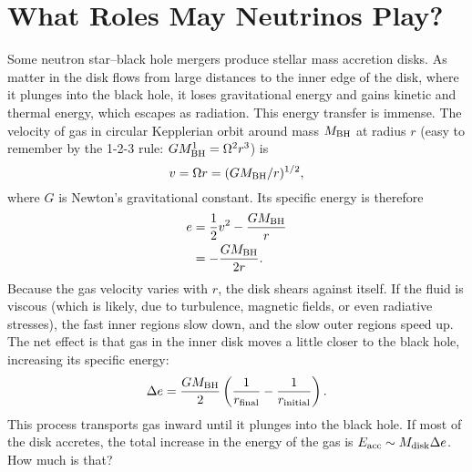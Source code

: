 \section{What Roles May Neutrinos Play?}
\label{sec:neutrino_roles}
Some neutron star--black hole mergers produce stellar mass accretion disks.
As matter in the disk flows from large distances to the
inner edge of the disk, where it plunges into the black hole, it loses
gravitational energy and gains kinetic and thermal energy, which escapes
as radiation. This energy transfer is immense. The velocity of gas in circular
Kepplerian orbit around mass $M_{\rm BH}$ at radius $r$
(easy to remember by the 1-2-3 rule: $GM_{\rm BH}^1=\Omega^2r^3$) is
\begin{equation}
  v = \Omega r  = (GM_{\rm BH}/r)^{1/2}, \nonumber
\end{equation}
where $G$ is Newton's gravitational constant.
Its specific energy is therefore
\begin{align}
  e &= \frac{1}{2}v^2-\frac{GM_{\rm BH}}{r} \nonumber \\
  &= -\frac{GM_{\rm BH}}{2r}. \nonumber
\end{align}
Because the gas velocity varies with $r$, the disk shears against itself. If the
fluid is viscous (which is likely, due to turbulence, magnetic fields, or even
radiative stresses),
the fast inner regions slow down, and the slow outer regions speed up. The net
effect is that gas in the inner disk moves a little closer to the black hole,
increasing its specific energy:
\begin{equation}
  \Delta e = \frac{GM_{\rm BH}}{2}
  \left(\frac{1}{r_{\rm final}}-\frac{1}{r_{\rm initial}}\right). \nonumber
\end{equation}
This process transports gas inward until it plunges into the black hole.
If most of the disk accretes, the total increase in the energy of the gas
is $E_{\rm acc}\sim M_{\rm disk} \Delta e$. How much is that?

